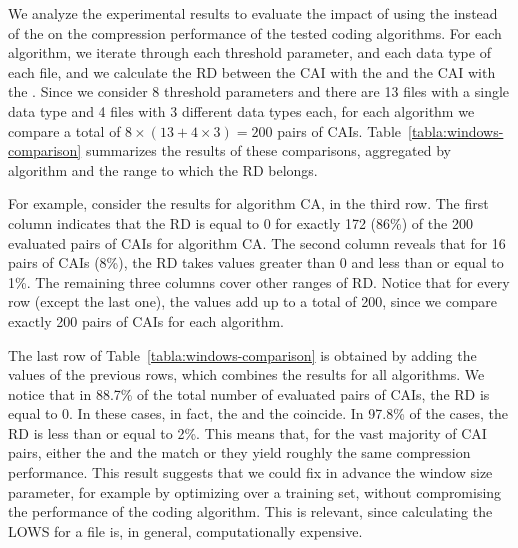 \clearpage


\clearpage


We analyze the experimental results to evaluate the impact of using the \ows instead of the \lows on the compression performance of the tested coding algorithms. For each algorithm, we iterate through each threshold parameter, and each data type of each file, and we calculate the RD between the CAI with the \ows and the CAI with the \lows. Since we consider 8 threshold parameters and there are 13 files with a single data type and 4 files with 3 different data types each, for each algorithm we compare a total of $8 \times (13 + 4\times3) = 200$ pairs of CAIs. Table~\ref{tabla:windows-comparison} summarizes the results of these comparisons, aggregated by algorithm and the range to which the RD belongs. 


\vspace{+5pt}

\vspace{-5pt}


For example, consider the results for algorithm CA, in the third row. The first column indicates that the RD is equal to 0 for exactly 172 (86\%) of the 200 evaluated pairs of CAIs for algorithm CA. The second column reveals that for 16 pairs of CAIs (8\%), the RD takes values greater than 0 and less than or equal to 1\%. The remaining three columns cover other ranges of RD. Notice that for every row (except the last one), the values add up to a total of 200, since we compare exactly 200 pairs of CAIs for each algorithm.


The last row of Table~\ref{tabla:windows-comparison} is obtained by adding the values of the previous rows, which combines the results for all algorithms. We notice that in 88.7\% of the total number of evaluated pairs of CAIs, the RD is equal to 0. In these cases, in fact, the \ows and the \lows coincide. In 97.8\% of the cases, the RD is less than or equal to 2\%. This means that, for the vast majority of CAI pairs, either the \ows and the \lows match or they yield roughly the same compression performance. This result suggests that we could fix in advance the window size parameter, for example by optimizing over a training set, without compromising the performance of the coding algorithm. This is relevant, since calculating the LOWS for a file is, in general, computationally expensive.


